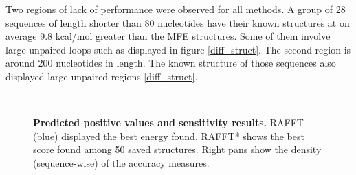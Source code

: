 \documentclass[a4paper,12pt]{article}
\begin{document}
{{Two regions of lack of performance were observed for all methods. A group of 28
sequences of length shorter than 80 nucleotides have their known structures at
on average 9.8 kcal/mol greater than the MFE structures. Some of them involve
large unpaired loops such as displayed in figure \ref{diff_struct}. The second
region is around 200 nucleotides in length. The known structure of those
sequences also displayed large unpaired regions \ref{diff_struct}.

\begin{figure}[!ht]
  \centering
  \\
  \caption{\textbf{Predicted positive values and sensitivity
      results\label{perf_fig}.} RAFFT (blue) displayed the best energy found.
    RAFFT* shows the best score found among 50 saved structures. Right pans show
    the density (sequence-wise) of the accuracy measures.}
\end{figure}

}}
\end{document}

